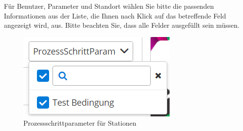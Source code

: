 \documentclass[enabledeprecatedfontcommands,fontsize=12pt,paper=a4,twoside]{scrartcl}
\begin{document}
Für Benutzer, Parameter und Standort wählen Sie bitte die passenden Informationen aus der Liste, die Ihnen nach Klick auf das betreffende Feld angezeigt wird, aus. Bitte beachten Sie, dass alle Felder ausgefüllt sein müssen. \\

\begin{figure}[h!]
\begin{center}
 \includegraphics[width=\textwidth]{screenshots/admin/stationpsp.png}
  \caption{Prozessschrittparameter für Stationen}
  \label{fig:boat2}
\end{center}
\end{figure}
\end{document}
